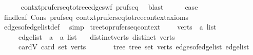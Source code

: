\begin{isabellebody}
\ \ \ \ \isamarkupfalse%
\ contxt{\isacharprime}{\kern0pt}{\isachardot}{\kern0pt}prufer{\isacharunderscore}{\kern0pt}seq{\isacharunderscore}{\kern0pt}to{\isacharunderscore}{\kern0pt}tree{\isacharunderscore}{\kern0pt}edges{\isacharunderscore}{\kern0pt}wf\ pruf{\isacharunderscore}{\kern0pt}seq{\isacharprime}{\kern0pt}\ \isamarkupfalse%
\ blast\isanewline
\ \ \isamarkupfalse%
\ \isamarkupfalse%
\ {\isacharquery}{\kern0pt}case\ \isamarkupfalse%
\ find{\isacharunderscore}{\kern0pt}leaf\ Cons\ pruf{\isacharunderscore}{\kern0pt}seq{\isacharprime}{\kern0pt}\ contxt{\isacharprime}{\kern0pt}{\isachardot}{\kern0pt}prufer{\isacharunderscore}{\kern0pt}seq{\isacharunderscore}{\kern0pt}to{\isacharunderscore}{\kern0pt}tree{\isacharunderscore}{\kern0pt}context{\isacharunderscore}{\kern0pt}axioms\isanewline
\ \ \ \ \isamarkupfalse%
\ edges{\isacharunderscore}{\kern0pt}of{\isacharunderscore}{\kern0pt}edge{\isacharunderscore}{\kern0pt}list{\isacharunderscore}{\kern0pt}def\ \isamarkupfalse%
\ simp\isanewline
{}\isamarkupfalse%
%
\endisatagproof
{\isafoldproof}%
%
\isadelimproof
\isanewline
%
\endisadelimproof
\isanewline
{}\isamarkupfalse%
\isanewline
\isanewline
{}\isamarkupfalse%
\ tree{\isacharunderscore}{\kern0pt}to{\isacharunderscore}{\kern0pt}prufer{\isacharunderscore}{\kern0pt}seq{\isacharunderscore}{\kern0pt}context\ {\isacharequal}{\kern0pt}\isanewline
\ \ \ verts\ {\isacharcolon}{\kern0pt}{\isacharcolon}{\kern0pt}\ {\isachardoublequoteopen}{\isacharprime}{\kern0pt}a\ list{\isachardoublequoteclose}\isanewline
\ \ \ \ \ edge{\isacharunderscore}{\kern0pt}list\ {\isacharcolon}{\kern0pt}{\isacharcolon}{\kern0pt}\ {\isachardoublequoteopen}{\isacharparenleft}{\kern0pt}{\isacharprime}{\kern0pt}a\ {\isasymtimes}\ {\isacharprime}{\kern0pt}a{\isacharparenright}{\kern0pt}\ list{\isachardoublequoteclose}\isanewline
\ \ \ distinct{\isacharunderscore}{\kern0pt}verts{\isacharcolon}{\kern0pt}\ {\isachardoublequoteopen}distinct\ verts{\isachardoublequoteclose}\isanewline
\ \ \ \ \ card{\isacharunderscore}{\kern0pt}V{\isacharcolon}{\kern0pt}\ {\isachardoublequoteopen}card\ {\isacharparenleft}{\kern0pt}set\ verts{\isacharparenright}{\kern0pt}\ {\isasymge}\ {}{\isachardoublequoteclose}\isanewline
\ \ \ \ \ tree{\isacharcolon}{\kern0pt}\ {\isachardoublequoteopen}tree\ {\isacharparenleft}{\kern0pt}set\ verts{\isacharparenright}{\kern0pt}\ {\isacharparenleft}{\kern0pt}edges{\isacharunderscore}{\kern0pt}of{\isacharunderscore}{\kern0pt}edge{\isacharunderscore}{\kern0pt}list\ edge{\isacharunderscore}{\kern0pt}list{\isacharparenright}{\kern0pt}{\isachardoublequoteclose}\isanewline

\end{isabellebody}
